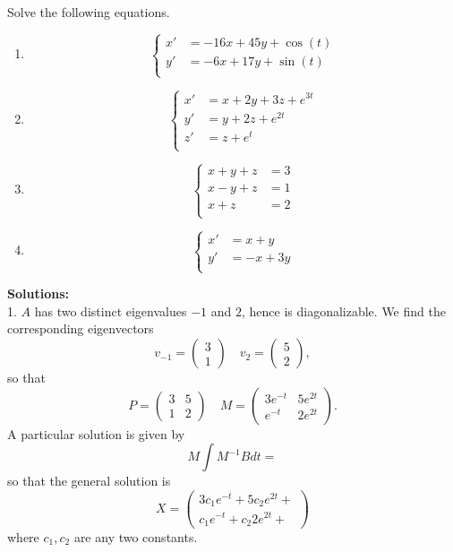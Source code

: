 \begin{Pb}
Solve the following equations.
\begin{enumerate}
\item \[\left\{\begin{split}
x' & = -16 x +45 y + \cos (t)\\
y' & = -6 x + 17 y + \sin (t)\\
\end{split}\right.\]

\item \[\left\{\begin{split}
x' & = x +2y+3z + e^{3t}\\
y' & = y + 2z + e^{2t} \\
z' & = z + e^{t}\\
\end{split}\right.\]

\item \[\left\{\begin{split}
x +y+z & = 3 \\
x -y+z & = 1\\
x+z & = 2\\
\end{split}\right.\]

\item \[\left\{\begin{split}
x' & =  x +y\\
y' & = -x+3y\\
\end{split}\right.\] 

\end{enumerate} 
\end{Pb}

\textbf{Solutions:} \\

1. $A$ has two distinct eigenvalues $-1$ and $2$, hence is diagonalizable. We find the corresponding eigenvectors 
\[v_{-1}= \begin{pmatrix} 3 \\ 1 \end{pmatrix} \quad v_{2}= \begin{pmatrix} 5 \\ 2 \end{pmatrix}, \]
so that 
\[P = \begin{pmatrix} 3 & 5 \\ 1 & 2 \end{pmatrix} \quad M= \begin{pmatrix} 3e^{-t} & 5e^{2t} \\ e^{-t} & 2e^{2t}\end{pmatrix}.\]
A particular solution is given by 
\[M \int M^{-1}B dt = \]
so that the general solution is 
\[X =  \begin{pmatrix} 3c_1 e^{-t} + 5 c_2 e^{2t} + \\ c_1 e^{-t}+ c_2 2e^{2t} + \end{pmatrix}\]
where $c_1, c_2$ are any two constants.\\

